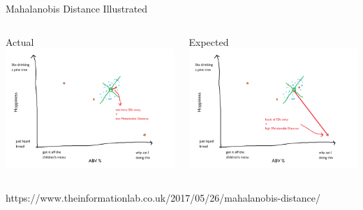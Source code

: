 \documentclass[aspectratio=169]{beamer}
\begin{document}
\begin{frame}{Mahalanobis Distance Illustrated}

\begin{columns}
\begin{column}{0.5\textwidth}
Actual\\
\includegraphics[width=1\textwidth]{./lectUL/mah1.png}
\end{column}
\begin{column}{0.5\textwidth}
Expected\\
\includegraphics[width=1\textwidth]{./lectUL/mah2.png}
\end{column}
\end{columns}
https://www.theinformationlab.co.uk/2017/05/26/mahalanobis-distance/
\end{frame}
\end{document}
